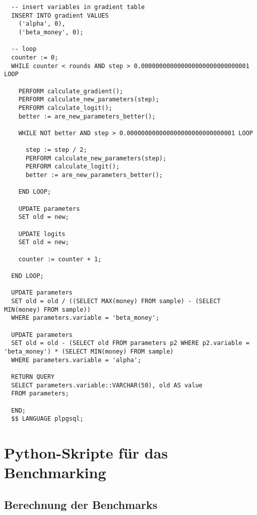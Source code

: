 \begin{verbatim}
  -- insert variables in gradient table
  INSERT INTO gradient VALUES
    ('alpha', 0),
    ('beta_money', 0);

  -- loop
  counter := 0;
  WHILE counter < rounds AND step > 0.000000000000000000000000000001 LOOP

    PERFORM calculate_gradient();
    PERFORM calculate_new_parameters(step);
    PERFORM calculate_logit();
    better := are_new_parameters_better();

    WHILE NOT better AND step > 0.000000000000000000000000000001 LOOP

      step := step / 2;
      PERFORM calculate_new_parameters(step);
      PERFORM calculate_logit();
      better := are_new_parameters_better();

    END LOOP;

    UPDATE parameters
    SET old = new;

    UPDATE logits
    SET old = new;

    counter := counter + 1;

  END LOOP;

  UPDATE parameters
  SET old = old / ((SELECT MAX(money) FROM sample) - (SELECT MIN(money) FROM sample))
  WHERE parameters.variable = 'beta_money';

  UPDATE parameters
  SET old = old - (SELECT old FROM parameters p2 WHERE p2.variable = 'beta_money') * (SELECT MIN(money) FROM sample)
  WHERE parameters.variable = 'alpha';

  RETURN QUERY
  SELECT parameters.variable::VARCHAR(50), old AS value
  FROM parameters;

  END;
  $$ LANGUAGE plpgsql;
\end{verbatim}

\chapter{Python-Skripte für das Benchmarking}
\label{appendix:F}

\section{Berechnung der Benchmarks}
\label{appendix:F:1}

